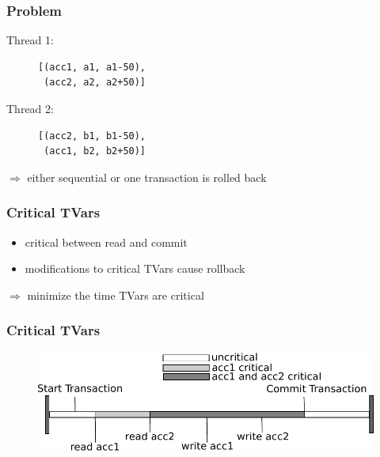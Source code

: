\documentclass{beamer}
\begin{document}
\begin{frame}[fragile]
    \frametitle{Problem}
    \fboxsep=0pt
    \noindent
    \begin{minipage}[t]{0.48\linewidth}
      Thread 1:
    \begin{figure}
     \begin{lstlisting}[frame=single]
[(acc1, a1, a1-50),
 (acc2, a2, a2+50)]
     \end{lstlisting}
    \end{figure}
    \end{minipage}%
    \hfill%
    \begin{minipage}[t]{0.48\linewidth}
      Thread 2:
    \begin{figure}
     \begin{lstlisting}[frame=single]
[(acc2, b1, b1-50),
 (acc1, b2, b2+50)]
     \end{lstlisting}
    \end{figure}
    \end{minipage}
    \vfill
    \pause
    $\Rightarrow$ either sequential or one transaction is rolled back
\end{frame}


\begin{frame}
 \frametitle{Critical TVars}
   \begin{itemize}\setlength\itemsep{1em}
    \item critical between read and commit
    \item modifications to critical TVars cause rollback
   \end{itemize}
   \pause
   \vfill
   $\Rightarrow$ minimize the time TVars are critical 
\end{frame}


  
  \begin{frame}
   \frametitle{Critical TVars}
   \begin{figure}
    \includegraphics[scale=0.7]{ressources/CriticalValue.pdf}
   \end{figure}
   \end{frame}
\end{document}
